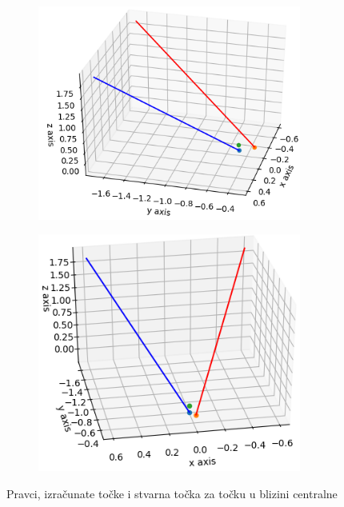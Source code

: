 \documentclass[times, utf8, diplomski]{fer}
\begin{document}
\begin{figure}[h]
\begin{subfigure}[b]{.5\textwidth}
\centering
	\includegraphics[width=0.95\textwidth]{pravci_t8_1}
	\caption*{}
	\label{fig:t8_1}
\end{subfigure}
\begin{subfigure}[b]{.5\textwidth}
	\centering
	\includegraphics[width=0.95\textwidth]{pravci_t8_2}
	\caption*{}
	\label{fig:t8_2}
\end{subfigure}
\caption{Pravci, izračunate točke i stvarna točka za točku u blizini centralne}
\label{fig:t8}
\end{figure}
\end{document}
